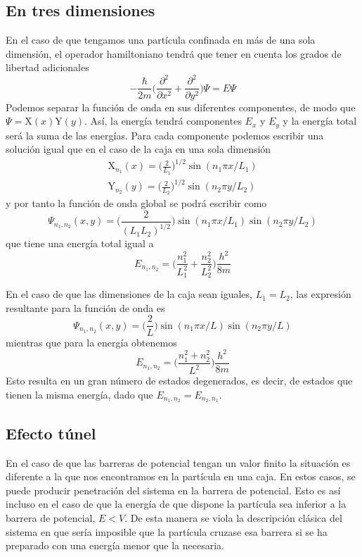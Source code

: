 \documentclass{tufte-handout}
\begin{document}
\subsection{En tres dimensiones}
En el caso de que tengamos una partícula confinada
en más de una sola dimensión, el operador 
hamiltoniano tendrá que tener en cuenta los 
grados de libertad adicionales
\begin{equation}
    -\frac{\hbar}{2m}\bigg(\frac{\partial^2}{\partial x^2} + \frac{\partial^2}{\partial y^2}\bigg)\Psi= E\Psi
\end{equation}
Podemos separar la función de onda en sus diferentes
componentes, de modo que $\Psi=\mathrm{X}(x)\mathrm{Y}(y)$. Así, la 
energía tendrá componentes $E_x$ y $E_y$ y la
energía total será la suma de las energías.
Para cada componente podemos escribir una
solución igual que en el caso de la caja
en una sola dimensión
\begin{subequations}
    \begin{align}
        \mathrm{X}_{n_1}(x)=\bigg(\frac{2}{L_1}\bigg)^{1/2}\sin(n_1\pi x/L_1) \\
        \mathrm{Y}_{n_2}(y)=\bigg(\frac{2}{L_2}\bigg)^{1/2}\sin(n_2\pi y/L_2)
    \end{align}
\end{subequations}
y por tanto la función de onda global se podrá
escribir como
\begin{equation}
        \Psi_{n_1, n_2}(x,y)=\bigg(\frac{2}{(L_1L_2)^{1/2}}\bigg)\sin(n_1\pi x/L_1)\sin(n_2\pi y/L_2)
\end{equation}
que tiene una energía total igual a
\begin{equation}
    E_{n_1,n_2} =\bigg(\frac{n_1^2}{L_1^2} + \frac{n_2^2}{L_2^2}\bigg)\frac{h^2}{8m}
\end{equation}

En el caso de que las dimensiones de la caja
sean iguales, $L_1=L_2$, las expresión resultante
para la función de onda es
\begin{equation}
    \Psi_{n_1, n_2}(x,y)=\bigg(\frac{2}{L}\bigg)\sin(n_1\pi x/L)\sin(n_2\pi y/L)
\end{equation}
mientras que para la energía obtenemos
\begin{equation}
    E_{n_1,n_2}=\bigg(\frac{n_1^2+n_2^2}{L^2}\bigg)\frac{h^2}{8m}
\end{equation}
Esto resulta en un gran número de estados degenerados, 
es decir, de estados que tienen la misma energía,
dado que $E_{n_1,n_2}=E_{n_2,n_1}$.

\subsection{Efecto túnel}
En el caso de que las barreras de potencial tengan un 
valor finito la situación es diferente a la que nos
encontramos en la partícula en una caja. En estos casos,
se puede producir penetración del sistema en la barrera 
de potencial. Esto es así incluso en el caso de que la
energía de que dispone la partícula sea inferior a la
barrera de potencial, $E<V$. De esta manera se viola la
descripción clásica del sistema en que sería imposible
que la partícula cruzase esa barrera si se ha preparado
con una energía menor que la necesaria.
\end{document}
